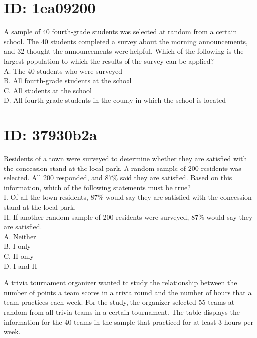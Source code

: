 

\section*{ID: 1ea09200}
A sample of 40 fourth-grade students was selected at random from a certain school. The 40 students completed a survey about the morning announcements, and 32 thought the announcements were helpful. Which of the following is the largest population to which the results of the survey can be applied?\\
A. The 40 students who were surveyed\\
B. All fourth-grade students at the school\\
C. All students at the school\\
D. All fourth-grade students in the county in which the school is located

\section*{ID: 37930b2a}
Residents of a town were surveyed to determine whether they are satisfied with the concession stand at the local park. A random sample of 200 residents was selected. All 200 responded, and $87 \%$ said they are satisfied. Based on this information, which of the following statements must be true?\\
I. Of all the town residents, $87 \%$ would say they are satisfied with the concession stand at the local park.\\
II. If another random sample of 200 residents were surveyed, $87 \%$ would say they are satisfied.\\
A. Neither\\
B. I only\\
C. II only\\
D. I and II














A trivia tournament organizer wanted to study the relationship between the number of points a team scores in a trivia round and the number of hours that a team practices each week. For the study, the organizer selected 55 teams at random from all trivia teams in a certain tournament. The table displays the information for the 40 teams in the sample that practiced for at least 3 hours per week.

